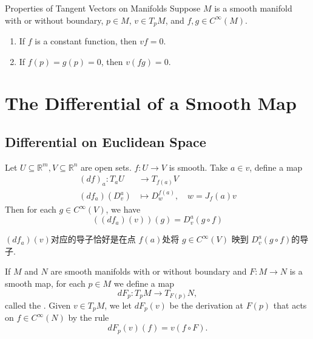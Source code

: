\documentclass[../main.tex]{subfiles}
\begin{document}
\begin{lemma}{Properties of Tangent Vectors on Manifolds}{}
Suppose $M$ is a smooth manifold with or without boundary, $p \in M$, $v \in T_p M$, and $f, g \in C^\infty(M)$.
\begin{enumerate}
\item[(a)] If $f$ is a constant function, then $v f = 0$.
\item[(b)] If $f(p) = g(p) = 0$, then $v(fg) = 0$.
\end{enumerate}
\end{lemma}
\section{The Differential of a Smooth Map}

\subsection{Differential on Euclidean Space}

\begin{lemma}{}{}
    Let \(  U\subseteq \mathbb{R} ^{m}, V\subseteq \mathbb{R} ^{n}  \) are open sets. \(  f:U\to V  \) is smooth. Take \(  a \in v  \), define a map \[
  \begin{aligned}
    \left( df \right)_{a}:T_{a}U&\to T_{f\left( a \right) }V \\ 
     \left( df_{a} \right)\left( D_{v}^{a} \right)&\mapsto D_{w}^{f\left( a \right) },\quad w= J_{f}\left( a \right) v
  \end{aligned}
    \]  Then for each \(  g \in C^{\infty}\left( V \right)   \), we have \[
   \left(  \left( df_{a} \right)\left( v \right) \right) \left( g \right)   = D_{v}^{a}\left( g\circ f \right) 
    \] 
\end{lemma}
\begin{note}
    \(  \left( df_{a} \right)\left( v \right)    \)对应的导子恰好是在点 \(  f\left( a \right)   \)处将 \(  g\in C^{\infty}\left( V \right)   \)   映到 \(  D_{v}^{a}\left( g\circ f \right)   \)的导子. 
\end{note}

\begin{definition}{}{}
    If $M$ and $N$ are smooth manifolds with or without boundary and $F: M \to N$ is a smooth map, for each $p \in M$ we define a map
\[
dF_p: T_pM \to T_{F(p)}N,
\]
called the  . Given $v \in T_pM$, we let $dF_p(v)$ be the derivation at $F(p)$ that acts on $f \in C^\infty(N)$ by the rule
\[
dF_p(v)(f) = v(f \circ F).
\]
\end{definition}
\end{document}
